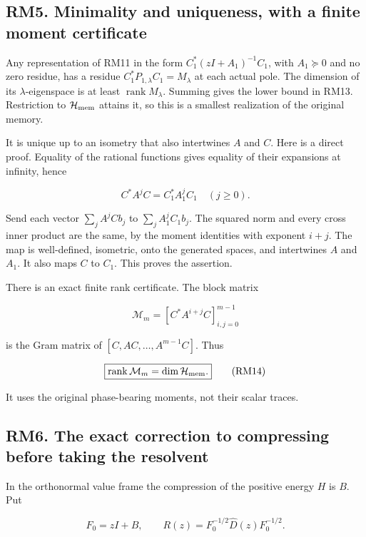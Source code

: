 \documentclass[11pt]{article}
\begin{document}
\subsection{RM5. Minimality and uniqueness, with a finite moment certificate}\label{rm5.-minimality-and-uniqueness-with-a-finite-moment-certificate}

Any representation of RM11 in the form \(C_1^*(zI+A_1)^{-1}C_1\), with \(A_1\succeq0\) and no zero residue, has a residue \(C_1^*P_{1,\lambda}C_1=M_\lambda\) at each actual pole. The dimension of its \(\lambda\)-eigenspace is at least \(\operatorname{rank}M_\lambda\). Summing gives the lower bound in RM13. Restriction to \(\mathcal H_{\rm mem}\) attains it, so this is a smallest realization of the original memory.

It is unique up to an isometry that also intertwines \(A\) and \(C\). Here is a direct proof. Equality of the rational functions gives equality of their expansions at infinity, hence

\[
 C^*A^jC=C_1^*A_1^jC_1\quad(j\ge0).
\]

Send each vector \(\sum_j A^jCb_j\) to \(\sum_j A_1^jC_1b_j\). The squared norm and every cross inner product are the same, by the moment identities with exponent \(i+j\). The map is well-defined, isometric, onto the generated spaces, and intertwines \(A\) and \(A_1\). It also maps \(C\) to \(C_1\). This proves the assertion.

There is an exact finite rank certificate. The block matrix

\[
 \mathcal M_m=[C^*A^{i+j}C]_{i,j=0}^{m-1}
\]

is the Gram matrix of \([C,AC,\ldots,A^{m-1}C]\). Thus

\[
 \boxed{\operatorname{rank}\mathcal M_m=\dim\mathcal H_{\rm mem}.}
 \tag{RM14}
\]

It uses the original phase-bearing moments, not their scalar traces.

\subsection{RM6. The exact correction to compressing before taking the resolvent}\label{rm6.-the-exact-correction-to-compressing-before-taking-the-resolvent}

In the orthonormal value frame the compression of the positive energy \(H\) is \(B\). Put

\[
 F_0=zI+B,\qquad R(z)=F_0^{-1/2}\widehat D(z)F_0^{-1/2}.
\]
\end{document}

